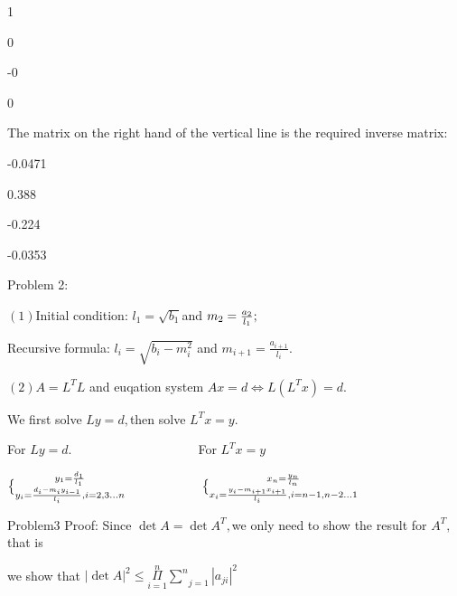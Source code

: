 \documentclass{article}
\begin{document}
1\qquad \TEXTsymbol{\vert}\qquad

0\qquad \TEXTsymbol{\vert}\qquad

-0\qquad \TEXTsymbol{\vert}\qquad

0\qquad \TEXTsymbol{\vert}\qquad

The matrix on the right hand of the vertical line is the required inverse
matrix:

-0.0471\qquad

0.388\qquad

-0.224\qquad

-0.0353\qquad

Problem 2:

$\left( 1\right) $Initial condition: $l_{1}=\sqrt{b_{1}}$and $m_{2}=\frac{%
a_{2}}{l_{1}};$

Recursive formula: $l_{i}=\sqrt{b_{i}-m_{i}^{2}}$ and $m_{i+1}=\frac{a_{i+1}%
}{l_{i}}.$

$\left( 2\right) A=L^{T}L$ and euqation system $Ax=d\iff L\left(
L^{T}x\right) =d.$

We first solve $Ly=d,$then solve $L^{T}x=y.$

For $Ly=d.\qquad \qquad \qquad \qquad \qquad $For $L^{T}x=y$

$\bigskip \QATOPD\{ . {y_{1}=\frac{d_{1}}{l_{1}}}{y_{i}=\frac{%
d_{i}-m_{i}y_{i-1}}{l_{i}},i=2,3...n}\qquad \qquad \qquad \QATOPD\{ . {x_{n}=%
\frac{y_{n}}{l_{n}}}{x_{i}=\frac{y_{i}-m_{i+1}x_{i+1}}{l_{i}},i=n-1,n-2...1}$


Problem3 Proof: Since $\det A=\det A^{T},$we only need to show the result
for $A^{T},$that is

we show that $\left\vert \det A\right\vert ^{2}\leq \underset{i=1}{\overset{n%
}{\Pi }}\underset{j=1}{\overset{n}{\sum }}\left\vert a_{ji}\right\vert ^{2}$
\end{document}
